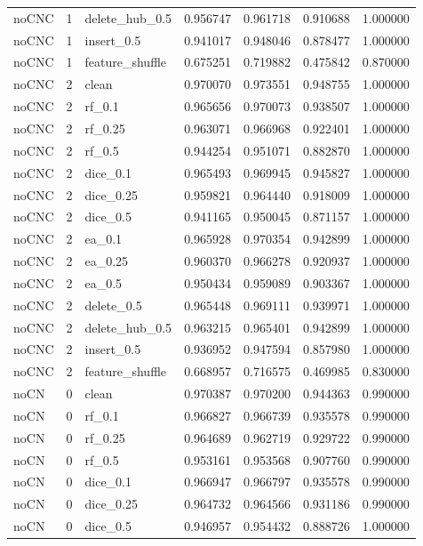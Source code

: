\documentclass[UTF8,a4paper,11pt,fontset=fandol]{ctexart}
\begin{document}
{\begin{longtable}{lrlrrrr}
noCNC & 1 & delete\_hub\_0.5 & 0.956747 & 0.961718 & 0.910688 & 1.000000 \\
noCNC & 1 & insert\_0.5 & 0.941017 & 0.948046 & 0.878477 & 1.000000 \\
noCNC & 1 & feature\_shuffle & 0.675251 & 0.719882 & 0.475842 & 0.870000 \\
noCNC & 2 & clean & 0.970070 & 0.973551 & 0.948755 & 1.000000 \\
noCNC & 2 & rf\_0.1 & 0.965656 & 0.970073 & 0.938507 & 1.000000 \\
noCNC & 2 & rf\_0.25 & 0.963071 & 0.966968 & 0.922401 & 1.000000 \\
noCNC & 2 & rf\_0.5 & 0.944254 & 0.951071 & 0.882870 & 1.000000 \\
noCNC & 2 & dice\_0.1 & 0.965493 & 0.969945 & 0.945827 & 1.000000 \\
noCNC & 2 & dice\_0.25 & 0.959821 & 0.964440 & 0.918009 & 1.000000 \\
noCNC & 2 & dice\_0.5 & 0.941165 & 0.950045 & 0.871157 & 1.000000 \\
noCNC & 2 & ea\_0.1 & 0.965928 & 0.970354 & 0.942899 & 1.000000 \\
noCNC & 2 & ea\_0.25 & 0.960370 & 0.966278 & 0.920937 & 1.000000 \\
noCNC & 2 & ea\_0.5 & 0.950434 & 0.959089 & 0.903367 & 1.000000 \\
noCNC & 2 & delete\_0.5 & 0.965448 & 0.969111 & 0.939971 & 1.000000 \\
noCNC & 2 & delete\_hub\_0.5 & 0.963215 & 0.965401 & 0.942899 & 1.000000 \\
noCNC & 2 & insert\_0.5 & 0.936952 & 0.947594 & 0.857980 & 1.000000 \\
noCNC & 2 & feature\_shuffle & 0.668957 & 0.716575 & 0.469985 & 0.830000 \\
noCN & 0 & clean & 0.970387 & 0.970200 & 0.944363 & 0.990000 \\
noCN & 0 & rf\_0.1 & 0.966827 & 0.966739 & 0.935578 & 0.990000 \\
noCN & 0 & rf\_0.25 & 0.964689 & 0.962719 & 0.929722 & 0.990000 \\
noCN & 0 & rf\_0.5 & 0.953161 & 0.953568 & 0.907760 & 0.990000 \\
noCN & 0 & dice\_0.1 & 0.966947 & 0.966797 & 0.935578 & 0.990000 \\
noCN & 0 & dice\_0.25 & 0.964732 & 0.964566 & 0.931186 & 0.990000 \\
noCN & 0 & dice\_0.5 & 0.946957 & 0.954432 & 0.888726 & 1.000000 \\

\end{longtable}}
\end{document}
